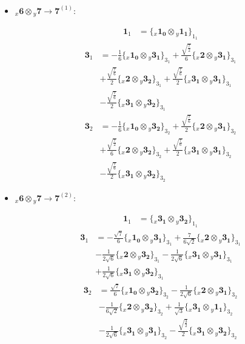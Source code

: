 \documentclass[english]{article}
\newcommand{\rep}[1]{\mathbf{#1}}
\newcommand{\repx}[2]{{}_{#2}\mathbf{#1}}
\newcommand{\tsprodx}[2]{\repx{#1}{x}\otimes\repx{#2}{y}}
\newcommand{\subcgs}[3]{\big\{ \tsprodx{#1}{#2}\big\}^{}_{#3}}
\begin{document}
\begin{itemize}
\begin{fleqn}
\begin{align*}
\end{align*}
\end{fleqn}
\item $\tsprodx{6}{7}\to\rep{7}^{(1)}$:
\begin{fleqn}
\begin{align*}
\rep{1}_{1} & = \subcgs{1_{0}}{1_{1}}{1_{1}}
\end{align*}
\begin{align*}
\rep{3}_{1} & = -\frac{1}{6}\subcgs{1_{0}}{3_{1}}{3_{1}}+\frac{\sqrt{\frac{7}{2}}}{6}\subcgs{2}{3_{1}}{3_{1}} \\ 
 & +\frac{\sqrt{\frac{7}{6}}}{2}\subcgs{2}{3_{2}}{3_{1}}+\frac{\sqrt{\frac{7}{6}}}{2}\subcgs{3_{1}}{3_{1}}{3_{1}} \\ 
 & -\frac{\sqrt{\frac{7}{6}}}{2}\subcgs{3_{1}}{3_{2}}{3_{1}}
\end{align*}
\begin{align*}
\rep{3}_{2} & = -\frac{1}{6}\subcgs{1_{0}}{3_{2}}{3_{2}}+\frac{\sqrt{\frac{7}{6}}}{2}\subcgs{2}{3_{1}}{3_{2}} \\ 
 & +\frac{\sqrt{\frac{7}{2}}}{6}\subcgs{2}{3_{2}}{3_{2}}+\frac{\sqrt{\frac{7}{6}}}{2}\subcgs{3_{1}}{3_{1}}{3_{2}} \\ 
 & -\frac{\sqrt{\frac{7}{6}}}{2}\subcgs{3_{1}}{3_{2}}{3_{2}}
\end{align*}
\end{fleqn}
\item $\tsprodx{6}{7}\to\rep{7}^{(2)}$:
\begin{fleqn}
\begin{align*}
\rep{1}_{1} & = \subcgs{3_{1}}{3_{2}}{1_{1}}
\end{align*}
\begin{align*}
\rep{3}_{1} & = -\frac{\sqrt{7}}{6}\subcgs{1_{0}}{3_{1}}{3_{1}}+\frac{7}{6 \sqrt{2}}\subcgs{2}{3_{1}}{3_{1}} \\ 
 & -\frac{1}{2 \sqrt{6}}\subcgs{2}{3_{2}}{3_{1}}-\frac{1}{2 \sqrt{6}}\subcgs{3_{1}}{3_{1}}{3_{1}} \\ 
 & +\frac{1}{2 \sqrt{6}}\subcgs{3_{1}}{3_{2}}{3_{1}}
\end{align*}
\begin{align*}
\rep{3}_{2} & = \frac{\sqrt{7}}{6}\subcgs{1_{0}}{3_{2}}{3_{2}}-\frac{1}{2 \sqrt{6}}\subcgs{2}{3_{1}}{3_{2}} \\ 
 & -\frac{1}{6 \sqrt{2}}\subcgs{2}{3_{2}}{3_{2}}+\frac{1}{\sqrt{3}}\subcgs{3_{1}}{1_{1}}{3_{2}} \\ 
 & -\frac{1}{2 \sqrt{6}}\subcgs{3_{1}}{3_{1}}{3_{2}}-\frac{\sqrt{\frac{3}{2}}}{2}\subcgs{3_{1}}{3_{2}}{3_{2}}

\end{align*}
\end{fleqn}
\end{itemize}
\end{document}
